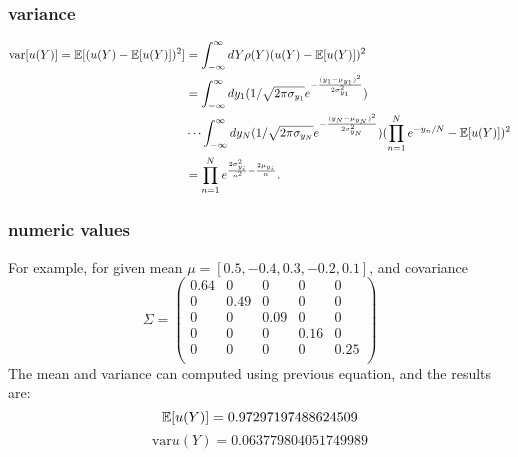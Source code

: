 \subsubsection{variance}
\begin{align}
\text{var}[u(Y)]=\mathbb{E}[ (u(Y)-\mathbb{E}[ u(Y)])^2] &= \int_{-\infty}^\infty dY \rho(Y)(u(Y)-\mathbb{E}[ u(Y)])^2 \notag \\
  &=\int_{-\infty}^\infty dy_1 (1/\sqrt{2 \pi \sigma_{y_1}}e^{-\frac{(y_1-\mu_{y_1})^2}{2\sigma_{y_1}^2}})\\
  &\cdots\int_{-\infty}^\infty dy_N  (1/\sqrt{2 \pi \sigma_{y_N}}e^{-\frac{(y_N-\mu_{y_N})^2}{2\sigma_{y_N}^2}})(\prod_{n=1}^N e^{-y_n/N}-\mathbb{E}[ u(Y)])^2 \notag\\
  &=\prod_{n=1}^N e^{\frac{2 \sigma_{y_i}^2}{n^2}-\frac{2\mu_{y_i}}{n}}. \notag
\end{align}
\subsubsection{numeric values}
For example, for given mean $\mu = [0.5, -0.4, 0.3, -0.2, 0.1]$, and covariance 
\begin{equation}
\Sigma = 
\begin{pmatrix} 
0.64 & 0 & 0 & 0 & 0 \\ 
0 & 0.49 & 0 & 0 & 0 \\ 
0 & 0 & 0.09 & 0 & 0 \\ 
0 & 0 & 0 & 0.16 & 0 \\ 
0 & 0 & 0 & 0 & 0.25 \\ 
\end{pmatrix} 
\end{equation}
The mean and variance can computed using previous equation, and the results are:
\begin{equation}
\mathbb{E}[ u(Y)] = 0.97297197488624509
\end{equation}
\begin{equation}
\text{var}{u(Y)} = 0.063779804051749989
\end{equation}
